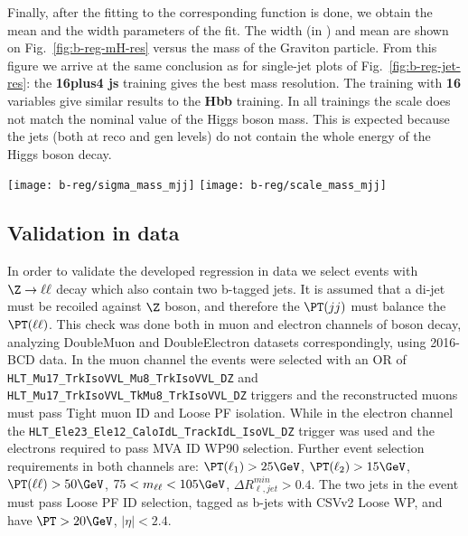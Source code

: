 Finally, after the fitting to the corresponding function is done, we
obtain the mean and the width parameters of the fit.  The width (in
\GeV) and mean are shown on Fig.~\ref{fig:b-reg-mH-res} versus the
mass of the Graviton particle.  From this figure we arrive at the same
conclusion as for single-jet plots of Fig.~\ref{fig:b-reg-jet-res}:
the \textbf{16plus4 js} training gives the best mass resolution. The
training with \textbf{16} variables give similar results to the
\textbf{Hbb} training.  In all trainings the scale does not match
the nominal value of the Higgs boson mass. This is expected because
the jets (both at reco and gen levels) do not contain the whole energy
of the Higgs boson decay.


\begin{figure*}[thb]
  \centering
  \texttt{[image: b-reg/sigma\_mass\_mjj]}\hfil
  \texttt{[image: b-reg/scale\_mass\_mjj]}\hfil
  \caption{Performance plot comparing different regression trainings.}
  \label{fig:b-reg-mH-res}
\end{figure*}


\clearpage
\subsection{Validation in data}

In order to validate the developed regression in data we select events
with $\Z\to\ell\ell$ decay which also contain two b-tagged jets. It is
assumed that a di-jet must be recoiled against $\Z$ boson, and
therefore the $\PT(jj)$ must balance the $\PT(\ell\ell)$.  This check
was done both in muon and electron channels of \Z boson decay,
analyzing DoubleMuon and DoubleElectron datasets correspondingly,
using 2016-BCD data. In the muon channel the events were selected with
an OR of \verb|HLT_Mu17_TrkIsoVVL_Mu8_TrkIsoVVL_DZ| and
\verb|HLT_Mu17_TrkIsoVVL_TkMu8_TrkIsoVVL_DZ| triggers and the
reconstructed muons must pass Tight muon ID and Loose PF
isolation. While in the electron channel the
\verb|HLT_Ele23_Ele12_CaloIdL_TrackIdL_IsoVL_DZ| trigger was used and
the electrons required to pass MVA ID WP90 selection.  Further event
selection requirements in both channels are: $\PT(\ell_1) > 25\GeV$,
$\PT(\ell_2) > 15\GeV$, $\PT(\ell\ell) > 50\GeV$,
$75<m_{\ell\ell}<105\GeV$, $\Delta R^{min}_{\ell, jet} > 0.4$. The two
jets in the event must pass Loose PF ID selection, tagged as b-jets
with CSVv2 Loose WP, and have $\PT>20\GeV$, $|\eta|<2.4$.


